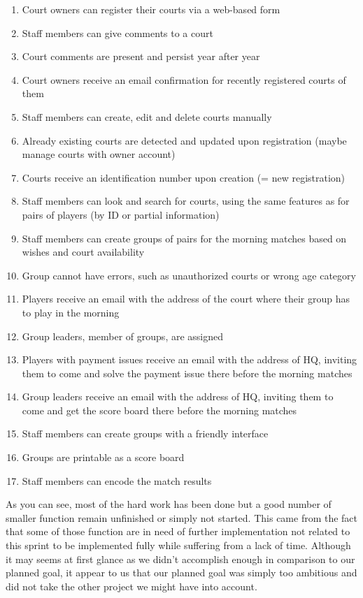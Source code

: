 \begin{enumerate}
    \item Court owners can register their courts via a web-based form
    \item Staff members can give comments to a court
    \item Court comments are present and persist year after year
    \item Court owners receive an email confirmation for recently
        registered courts of them
    \item Staff members can create, edit and delete courts manually
\color{red!80!black}
    \item Already existing courts are detected and updated upon
        registration (maybe manage courts with owner account)
\color{green!60!black}
    \item Courts receive an identification number upon creation (= new
        registration)
\color{red!80!black}
    \item Staff members can look and search for courts, using the same
        features as for pairs of players (by ID or partial information)
\color{orange!80!black}
    \item Staff members can create groups of pairs for the morning
        matches based on wishes and court availability
\color{red!80!black}
    \item Group cannot have errors, such as unauthorized courts or wrong
        age category
\color{orange!80!black}
    \item Players receive an email with the address of the court where
        their group has to play in the morning
    \item Group leaders, member of groups, are assigned
    \item Players with payment issues receive an email with the address
        of HQ, inviting them to come and solve the payment issue there
        before the morning matches
    \item Group leaders receive an email with the address of HQ,
        inviting them to come and get the score board there before the
        morning matches
    \item Staff members can create groups with a friendly interface
\color{red!80!black}
    \item Groups are printable as a score board
    \item Staff members can encode the match results
\end{enumerate}

As you can see, most of the hard work has been done but a good number of smaller function remain unfinished or simply not started. This came from the fact that some of those function are in need of further implementation not related to this sprint to be implemented fully while suffering from a lack of time. Although it may seems at first glance as we didn't accomplish enough in comparison to our planned goal, it appear to us that our planned goal was simply too ambitious and did not take the other project we might have into account.